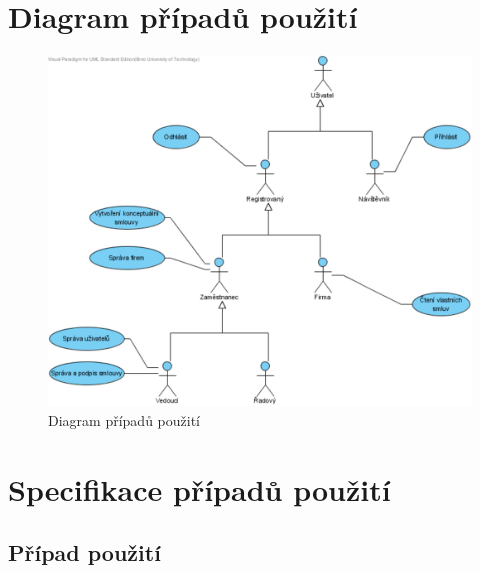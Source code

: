 
\section*{Diagram případů použití}

\begin{figure}[H]
	\begin{center}
		\includegraphics[width=12.5cm,keepaspectratio]{include/use_case_stage1}
	\end{center}
	\caption{Diagram případů použití}
\end{figure}

\section*{Specifikace případů použití}

\subsection*{Případ použití }

